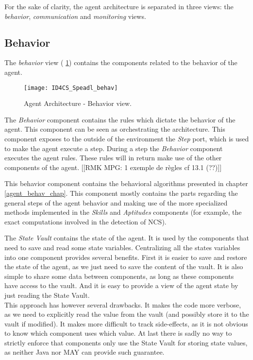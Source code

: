 For the sake of clarity, the agent architecture is separated in three views: the \emph{behavior}, \emph{communication} and \emph{monitoring} views.

\subsection{Behavior}

The \emph{behavior} view (\figurename{} \ref{Arch-behavior}) contains the components related to the behavior of the agent. 

\begin{figure}
\centering
\texttt{[image: ID4CS\_Speadl\_behav]}
\caption{Agent Architecture - Behavior view.}
\label{Arch-behavior}
\end{figure}

The \emph{Behavior} component contains the rules which dictate the behavior of the agent. This component can be seen as orchestrating the architecture. This component exposes to the outside of the environment the \emph{Step} port, which is used to make the agent execute a step. During a step the \emph{Behavior} component executes the agent rules. These rules will in return make use of the other components of the agent. [[RMK MPG: 1 exemple de règles cf 13.1 (??)]]

This behavior component contains the behavioral algorithms presented in chapter \ref{agent_behav_chap}. This component mostly contains the parts regarding the general steps of the agent behavior and making use of the more specialized methods implemented in the \emph{Skills} and \emph{Aptitudes} components (for example, the exact computations involved in the detection of NCS).

The \emph{State Vault} contains the state of the agent. It is used by the components that need to save and read some state variables. Centralizing all the states variables into one component provides several benefits. First it is easier to save and restore the state of the agent, as we just need to save the content of the vault. It is also simple to share some data between components, as long as these components have access to the vault. And it is easy to provide a view of the agent state by just reading the State Vault.\\
This approach has however several drawbacks. It makes the code more verbose, as we need to explicitly read the value from the vault (and possibly store it to the vault if modified). It makes more difficult to track side-effects, as it is not obvious to know which component uses which value. At last there is sadly no way to strictly enforce that components only use the State Vault for storing state values, as neither Java nor MAY can provide such guarantee.

